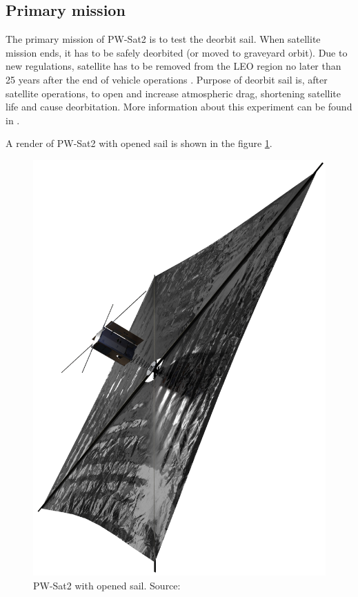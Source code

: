     \subsection{Primary mission}
        The primary mission of PW-Sat2 is to test the deorbit sail. When satellite mission ends, it has to be safely deorbited (or moved to graveyard orbit). Due to new regulations, satellite has to be removed from
        the LEO region no later than 25 years after the end of vehicle operations \cite{Satellite_disposal}. Purpose of deorbit sail is, after satellite operations, to open and increase atmospheric drag, shortening satellite life and cause deorbitation. More information about this experiment can be found in \cite{DDC_article}.

        A render of PW-Sat2 with opened sail is shown in the figure \ref{PW-Sat_render_sail}.

        \begin{figure}[H]
            \centering
            \includegraphics[width=0.38\paperwidth]{img/1/PW-Sat2_render_02.png}
            \caption{PW-Sat2 with opened sail. Source: \cite{PW_sat2_photo}}
            \label{PW-Sat_render_sail}
        \end{figure}

